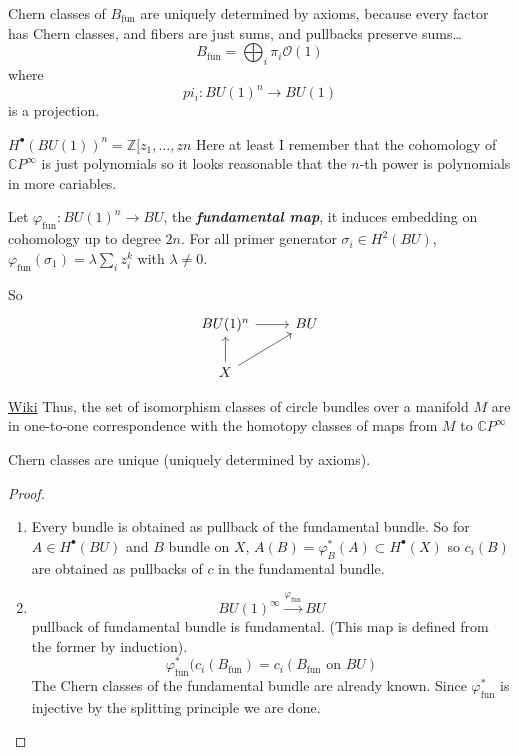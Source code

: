 \begin{remark}
	Chern classes of $B_{\operatorname{f un}}$ are uniquely determined by axioms, because every factor has Chern classes, and fibers are just sums, and pullbacks preserve sums…
	\[B_{\operatorname{f un}}=\bigoplus_{i} \pi_i \mathcal{O}(1) \]
	where
	\[pi_i:BU(1)^n\to BU(1)\]
	is a projection.
\end{remark}

\begin{remark}
	$H^{\bullet}(BU(1))^n=\mathbb{Z}[z_1,\ldots,zn$ 
	Here at least I remember that the cohomology of $\mathbb{C}P^{\infty}$ is just polynomials so it looks reasonable that the $n$-th power is polynomials in more cariables.
\end{remark}

\begin{thm}\leavevmode
	Let $\varphi_{\operatorname{f un}}:BU(1)^n\to BU$, the \textit{\textbf{fundamental map}}, it induces embedding on cohomology up to degree $2n$. For all primer generator $\sigma_i\in H^{2}(BU)$, $\varphi_{\operatorname{f un}}(\sigma_1)=\lambda \sum_{i}z_i^k$ with $\lambda\neq 0$.

	So
	\[\begin{tikzcd}
		BU(1)^n \arrow[r]& BU\\
		X\arrow[u]\arrow[ur]
	\end{tikzcd}\]
	
\end{thm}

\begin{remark}
	\href{https://en.wikipedia.org/wiki/Classifying_space_for_U(n)}{Wiki} Thus, the set of isomorphism classes of circle bundles over a manifold $M$ are in one-to-one correspondence with the homotopy classes of maps from $M$ to $\mathbb{C}P^{\infty}$
\end{remark}

\begin{thm}
	Chern classes are unique (uniquely determined by axioms).
\end{thm}

\begin{proof}\leavevmode 
	\begin{enumerate}[label=\textbf{Step \arabic*}]
		\item Every bundle is obtained as pullback of the fundamental bundle. So for $A\in H^{\bullet}(BU)$ and $B$ bundle on $X$, $A(B)=\varphi^*_{B}(A)\subset H^{\bullet}(X)$ so $c_i(B)$ are obtained as pullbacks of $ c$ in the fundamental bundle.

		\item \[BU(1)^\infty \overset{\varphi_{\operatorname{f un}}}{\longrightarrow}BU\]
			pullback of fundamental bundle is fundamental. (This map is defined from the former by induction).
			\[\varphi^*_{\operatorname{fu n}}(c_i(B_{\operatorname{f un}})=c_i(B_{\operatorname{f un}}\text{ on $BU$} )\]
			The Chern classes of the fundamental bundle are already known. Since $\varphi^*_{\operatorname{f un}}$ is injective by the splitting principle we are done.
	\end{enumerate}
\end{proof}


